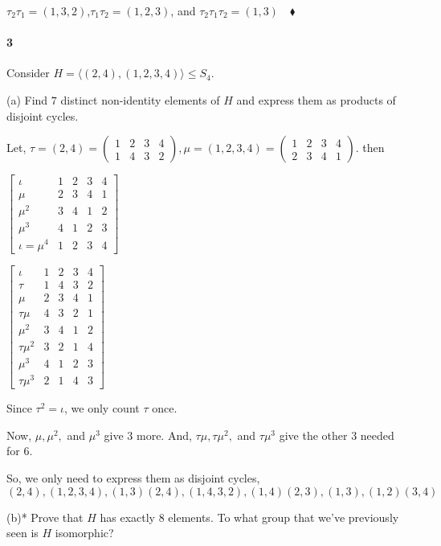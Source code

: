 \documentclass{article}
\begin{document}
 $\tau_2\tau_1 = (1,3,2)$,$\tau_1\tau_2 = (1,2,3)$, and
 $\tau_2\tau_1\tau_2 = (1,3)\quad \blacklozenge$

\paragraph{3} Consider $H = \langle (2,4), (1,2,3,4) \rangle \leq
S_4$.

(a) Find $7$ distinct non-identity elements of $H$ and express them as
products of disjoint cycles.


Let, $\tau = (2,4)= \begin{pmatrix}1&2&3&4\\1&4&3&2\end{pmatrix}, \mu
= (1,2,3,4) = \begin{pmatrix}1&2&3&4 \\ 2&3&4&1\end{pmatrix}$. then

$\begin{bmatrix}
  \iota& 1&2&3&4\\
  \mu  & 2&3&4&1\\
  \mu^2& 3&4&1&2\\
  \mu^3& 4&1&2&3\\
  \iota = \mu^4& 1&2&3&4
\end{bmatrix}$

$\begin{bmatrix}
    \iota& 1&2&3&4\\
    \tau & 1&4&3&2\\
    \mu  & 2&3&4&1\\
  \tau\mu& 4&3&2&1\\
    \mu^2& 3&4&1&2\\
\tau\mu^2& 3&2&1&4\\
    \mu^3& 4&1&2&3\\
\tau\mu^3& 2&1&4&3
\end{bmatrix}$

Since $\tau^2 = \iota$, we only count $\tau$ once.

Now, $\mu,\mu^2,$ and $\mu^3$ give $3$ more.
And, $\tau\mu,\tau\mu^2,$ and $\tau\mu^3$ give the other $3$ needed for
$6$.

So, we only need to express them as disjoint cycles,
$$(2,4),(1,2,3,4),(1,3)(2,4),(1,4,3,2),(1,4)(2,3),(1,3),(1,2)(3,4)$$


\newpage
(b)* Prove that $H$ has exactly $8$ elements. To what group that we've
previously seen is $H$ isomorphic?
\end{document}

